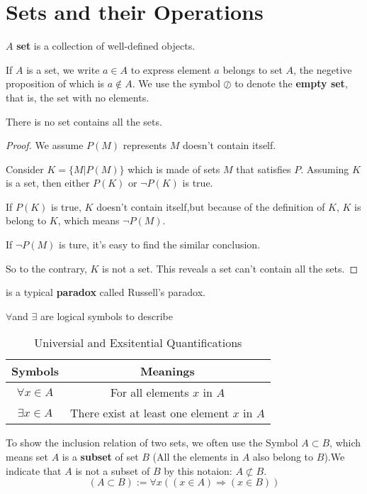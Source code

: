 \section{Sets and their Operations}

$A$ \textbf{set} is a collection of well-defined objects.

If $A$ is a set, we write $a \in A$ to express element $a$ belongs to set $A$, the negetive proposition of which is $a \notin A$. We use the symbol $\oslash$ to denote the \textbf{empty set}, that is, the set with no elements.

\begin{theorem}[Cantor]\label{thm:Russell's paradox}
    There is no set contains all the sets.
\end{theorem}
\begin{proof}
    We assume $P(M)$ represents $M$ doesn't contain itself.

    Consider $K=\{M|P(M)\}$ which is made of sets $M$ that satisfies  $P$. Assuming $K$ is a set, then either $P(K)$ or $\lnot P(K)$ is true.
    
    If $P(K)$ is true, $K$ doesn't contain itself,but because of the definition of $K$, $K$ is belong to $K$, which means $\lnot P(M)$.

    If $\lnot P(M)$ is ture, it's easy to find the similar conclusion.

    So to the contrary, $K$ is not a set. This reveals a set can't contain all the sets.
\end{proof}

 is a typical \textbf{paradox} called Russell's paradox.

$\forall $and $\exists $ are logical symbols to describe
\begin{table}[H]
    \centering
    \caption{Universial and Exsitential Quantifications}
    \begin{tabular}{|c|c|}\hline
        Symbols&Meanings\\\hline
        $\forall x \in A$&For all elements $x$ in $A$\\
        $\exists x \in A$&There exist at least one element $x$ in $A$\\
        \hline
    \end{tabular}
\end{table}
To show the inclusion relation of two sets, we often use the Symbol $A \subset B$, which means set $A$ is a \textbf{subset} of set $B$ (All the elements in $A$ also belong to $B$).We indicate that $A$ is not a subset of $B$ by this notaion: $A \not\subset B$.
\[(A\subset B ):=\forall x((x\in A)\Rightarrow (x\in B))\]


